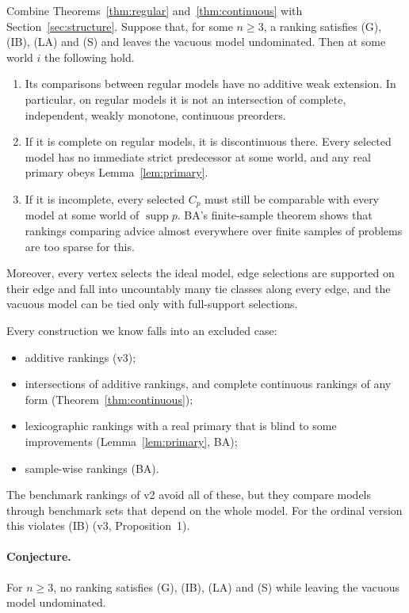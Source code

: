 \documentclass[11pt]{article}
\theoremstyle{remark}\newtheorem{remark}[theorem]{Remark}
\newcommand{\supp}{\operatorname{supp}}
\begin{document}
Combine Theorems~\ref{thm:regular} and~\ref{thm:continuous} with
Section~\ref{sec:structure}. Suppose that, for some $n\ge3$, a ranking satisfies
(G), (IB), (LA) and (S) and leaves the vacuous model undominated. Then at some
world $i$ the following hold.
\begin{enumerate}[label=(\roman*),leftmargin=*]
\item Its comparisons between regular models have no additive weak extension.
In particular, on regular models it is not an intersection of complete,
independent, weakly monotone, continuous preorders.
\item If it is complete on regular models, it is discontinuous there. Every
selected model has no immediate strict predecessor at some world, and any
real primary obeys Lemma~\ref{lem:primary}.
\item If it is incomplete, every selected $C_p$ must still be comparable with
every model at some world of $\supp p$. BA's finite-sample theorem shows that
rankings comparing advice almost everywhere over finite samples of problems
are too sparse for this.
\end{enumerate}
Moreover, every vertex selects the ideal model, edge selections are supported
on their edge and fall into uncountably many tie classes along every edge,
and the vacuous model can be tied only with full-support selections.

Every construction we know falls into an excluded case:
\begin{itemize}[leftmargin=*,itemsep=2pt]
\item additive rankings (v3);
\item intersections of additive rankings, and complete continuous rankings of
any form (Theorem~\ref{thm:continuous});
\item lexicographic rankings with a real primary that is blind to some
improvements (Lemma~\ref{lem:primary}, BA);
\item sample-wise rankings (BA).
\end{itemize}
The benchmark rankings of v2 avoid all of these, but they compare models
through benchmark sets that depend on the whole model. For the ordinal version
this violates (IB) (v3, Proposition~1).

\paragraph{Conjecture.} For $n\ge3$, no ranking satisfies (G), (IB), (LA) and
(S) while leaving the vacuous model undominated.
\end{document}

